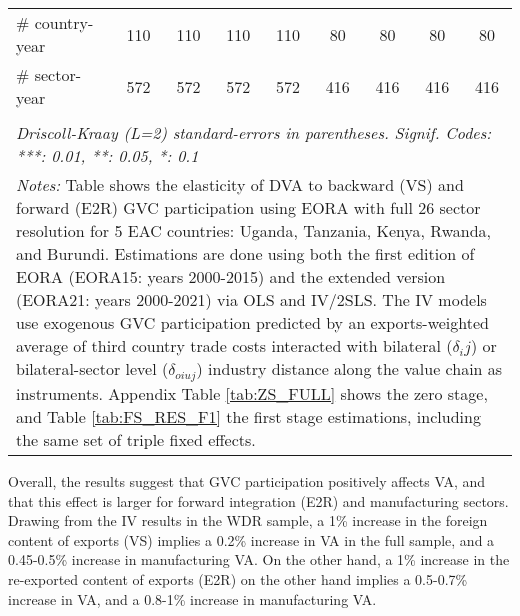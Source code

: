 \documentclass[a4paper]{article}
\begin{document}
\begin{table}[h!]
{\begin{tabular}{lcccccccc}
      \# country-year         & 110            & 110                   & 110                   & 110                   & 80       & 80                    & 80                    & 80\\  
      \# sector-year          & 572            & 572                   & 572                   & 572                   & 416      & 416                   & 416                   & 416\\  
      \bottomrule \\ [-0.9em]
      \multicolumn{9}{l}{\emph{Driscoll-Kraay (L=2) standard-errors in parentheses. Signif. Codes: ***: 0.01, **: 0.05, *: 0.1}}\\
      \multicolumn{9}{l}{\parbox{1.25\textwidth}{\scriptsize
\textit{Notes:} Table shows the elasticity of DVA to backward (VS) and forward (E2R) GVC participation using EORA with full 26 sector resolution for 5 EAC countries: Uganda, Tanzania, Kenya, Rwanda, and Burundi. Estimations are done using both the first edition of EORA (EORA15: years 2000-2015) and the extended version (EORA21: years 2000-2021) via OLS and IV/2SLS. The IV models use exogenous GVC participation predicted by an exports-weighted average of third country trade costs interacted with bilateral ($\delta_ij$) or bilateral-sector level ($\delta_{oiuj}$) industry distance along the value chain as instruments. Appendix Table \ref{tab:ZS_FULL} shows the zero stage, and Table \ref{tab:FS_RES_F1} the first stage estimations, including the same set of triple fixed effects. }}
   \end{tabular}
   }
\end{table}
\FloatBarrier

Overall, the results suggest that GVC participation positively affects VA, and that this effect is larger for forward integration (E2R) and manufacturing sectors. Drawing from the IV results in the WDR sample, a 1\% increase in the foreign content of exports (VS) implies a 0.2\% increase in VA in the full sample, and a 0.45-0.5\% increase in manufacturing VA. On the other hand, a 1\% increase in the re-exported content of exports (E2R) on the other hand implies a 0.5-0.7\% increase in VA, and a 0.8-1\% increase in manufacturing VA. 
\end{document}
